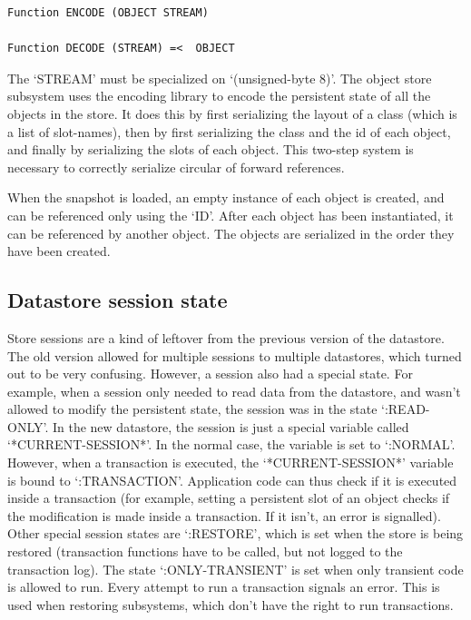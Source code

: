 \begin{Verbatim}[fontsize=\small,frame=leftline,framerule=0.9mm,rulecolor=\color{gray},framesep=5.1mm,xleftmargin=5mm,fontfamily=cmtt]
Function ENCODE (OBJECT STREAM)

Function DECODE (STREAM) =<  OBJECT
\end{Verbatim}
The `STREAM' must be specialized on `(unsigned-byte 8)'.
The object store subsystem uses the encoding library to encode the
persistent state of all the objects in the store. It does this by
first serializing the layout of a class (which is a list of
slot-names), then by first serializing the class and the id of
each object, and finally by serializing the slots of each
object. This two-step system is necessary to correctly serialize
circular of forward references.

When the snapshot is loaded, an empty instance of each object is
created, and can be referenced only using the `ID'. After each
object has been instantiated, it can be referenced by another
object. The objects are serialized in the order they have been
created.


\subsection{ Datastore session state}
Store sessions are a kind of leftover from the previous version of
the datastore. The old version allowed for multiple sessions to
multiple datastores, which turned out to be very
confusing. However, a session also had a special state. For
example, when a session only needed to read data from the
datastore, and wasn't allowed to modify the persistent state, the
session was in the state `:READ-ONLY'. In the new datastore, the
session is just a special variable called `*CURRENT-SESSION*'. In
the normal case, the variable is set to `:NORMAL'. However, when a
transaction is executed, the `*CURRENT-SESSION*' variable is bound
to `:TRANSACTION'. Application code can thus check if it is
executed inside a transaction (for example, setting a persistent
slot of an object checks if the modification is made inside a
transaction. If it isn't, an error is signalled).
Other special session states are `:RESTORE', which is set when the
store is being restored (transaction functions have to be called,
but not logged to the transaction log). The state
`:ONLY-TRANSIENT' is set when only transient code is allowed to
run. Every attempt to run a transaction signals an error. This is
used when restoring subsystems, which don't have the right to run
transactions.


